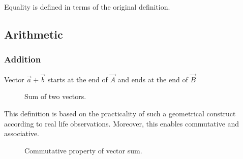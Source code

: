 \begin{note}
    Equality is defined in terms of the original definition.
\end{note}

\subsection{Arithmetic}%
\label{sub:vector-arithmetic}

\subsubsection{Addition}%
\label{ssub:vector-addition}

\begin{definition}
        Vector $\vec{a}+\vec{b}$ starts at the end of $\vec{A}$ and ends at the end of $\vec{B}$
\end{definition}

\begin{figure}[H]
    \begin{center}
    \end{center}
    \caption{Sum of two vectors.}%
    \label{fig:vector-sum}
\end{figure}


This definition is based on the practicality of such a geometrical construct according to real life observations. Moreover, this enables commutative and associative.

\begin{figure}[htpb]
    \begin{center}
    \end{center}
    \caption{Commutative property of vector sum.}%
    \label{fig:vector-sum-commutative}
\end{figure}

